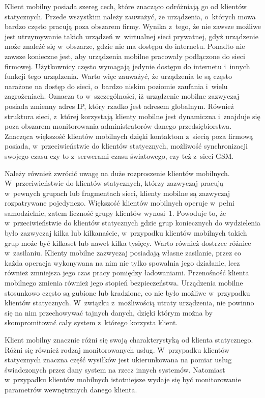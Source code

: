 Klient mobilny posiada szereg cech, które znacząco odróżniają go od
klientów statycznych. Przede wszystkim należy zauważyć, że urządzenia,
o~których mowa bardzo często pracują poza obszarem firmy. Wynika
z~tego, że nie zawsze możliwe jest utrzymywanie takich urządzeń
w~wirtualnej sieci prywatnej, gdyż urządzenie może znaleźć się
w~obszarze, gdzie nie ma dostępu do internetu. Ponadto nie zawsze
konieczne jest, aby urządzenia mobilne pracowały podłączone do sieci
firmowej. Użytkownicy często wymagają jedynie dostępu do internetu
i~innych funkcji tego urządzenia. Warto więc zauważyć, że urządzenia
te są często narażone na dostęp do sieci, o~bardzo niskim poziomie
zaufania i~wielu zagrożeniach. Oznacza to w~szczególności, iż
urządzenie mobilne zazwyczaj posiada zmienny adres IP, który rzadko
jest adresem globalnym. Również struktura sieci, z~której korzystają
klienty mobilne jest dynamiczna i~znajduje się poza obszarem
monitorowania administratorów danego przedsiębiorstwa. Znacząca
większość klientów mobilnych dzięki kontaktom z~siecią poza firmową
posiada, w~przeciwieństwie do klientów statycznych, możliwość
synchronizacji swojego czasu czy to z~serwerami czasu światowego, czy
też z~sieci GSM.

Należy również zwrócić uwagę na duże rozproszenie klientów
mobilnych. W~przeciwieństwie do klientów statycznych, którzy zazwyczaj
pracują w~pewnych grupach lub fragmentach sieci, klienty mobilne są
zazwyczaj rozpatrywane pojedynczo. Większość klientów mobilnych
operuje w~pełni samodzielnie, zatem liczność grupy klientów
wynosi~1. Powoduje to, że w~przeciwieństwie do klientów statycznych
gdzie grup koniecznych do wydzielenia było zazwyczaj kilka lub
kilkanaście, w~przypadku klientów mobilnych takich grup może być
kilkaset lub nawet kilka tysięcy. Warto również dostrzec różnice
w~zasilaniu. Klienty mobilne zazwyczaj posiadają własne zasilanie,
przez co każda operacja wykonywana na nim nie tylko spowalnia jego
działanie, lecz również zmniejsza jego czas pracy pomiędzy
ładowaniami. Przenośność klienta mobilnego zmienia również jego
stopień bezpieczeństwa. Urządzenia mobilne stosunkowo często są
gubione lub kradzione, co nie było możliwe w~przypadku klientów
statycznych. W~związku z~możliwością utraty urządzenia, nie powinno
się na nim przechowywać tajnych danych, dzięki którym można by
skompromitować cały system z~którego korzysta klient.

Klient mobilny znacznie różni się swoją charakterystyką od klienta
statycznego. Różni się również rodzaj monitorowanych
usług. W~przypadku klientów statycznych znaczna część wysiłków jest
ukierunkowana na pomiar usług świadczonych przez dany system na rzecz
innych systemów. Natomiast w~przypadku klientów mobilnych istotniejsze
wydaje się być monitorowanie parametrów wewnętrznych danego klienta.

